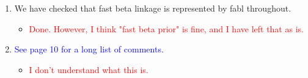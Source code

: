\documentclass[letterpaper, parskip]{scrartcl}
\begin{document}
\begin{enumerate}
\item We have checked that fast beta linkage is represented by fabl throughout.
\begin{itemize}
	\item \textcolor{red}{Done. However, I think "fast beta prior" is fine, and I have left that as is.}
\end{itemize} 

\item \textcolor{blue}{See page 10 for a long list of comments.}
\begin{itemize}
	\item \textcolor{red}{I don't understand what this is.}
\end{itemize}



\end{enumerate}
\end{document}
